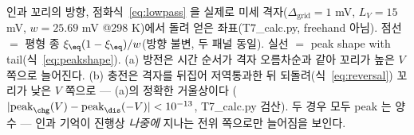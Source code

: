 \caption{인과 꼬리의 방향, 점화식~\eqref{eq:lowpass} 을 실제로 미세 격자($\Delta_\mathrm{grid}=1$ mV,
$L_V=15$ mV, $w{=}25.69$ mV @298 K)에서 돌려 얻은 좌표(T7\_calc.py, freehand 아님). 점선 $=$
평형 종 $\xi_\eq(1-\xi_\eq)/w$(방향 불변, 두 패널 동일). 실선 $=$ peak shape with tail(식~\eqref{eq:peakshape}).
(a) 방전은 시간 순서가 격자 오름차순과 같아 꼬리가 높은 $V$ 쪽으로 늘어진다. (b) 충전은 격자를 뒤집어
저역통과한 뒤 되돌려(식~\eqref{eq:reversal}) 꼬리가 낮은 $V$ 쪽으로 — (a)의 정확한 거울상이다
($|\text{peak}_\chg(V)-\text{peak}_\dis(-V)|<10^{-13}$, T7\_calc.py 검산). 두 경우 모두 peak 는 양수 —
인과 기억이 진행상 \emph{나중에} 지나는 전위 쪽으로만 늘어짐을 보인다.}
\label{fig:reversal}

